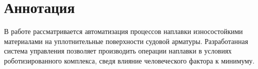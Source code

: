 \chapter{Аннотация}
В работе рассматривается автоматизация процессов наплавки износостойкими материалами на уплотнительные поверхности судовой арматуры.
Разработанная система управления позволяет производить операции наплавки в условиях роботизированного комплекса, сведя влияние человеческого фактора к минимуму.

